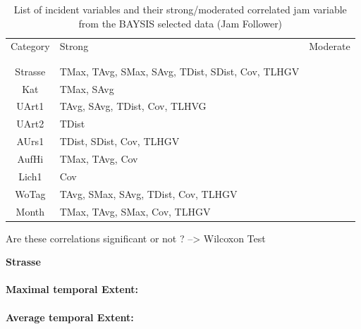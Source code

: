 \noindent
\begin{table}[h!]
	\centering
	\begin{tabular}{c|l|l}  
		Category & Strong & Moderate \\
		\\[-1em]
		\hline
		\\[-1em]
		Strasse & TMax, TAvg, SMax, SAvg, TDist, SDist, Cov, TLHGV & \\ 
 		Kat & TMax, SAvg & \\ 
 		UArt1 & TAvg, SAvg, TDist, Cov, TLHVG & \\
 		UArt2 & TDist & \\
 		AUrs1 & TDist, SDist, Cov, TLHGV & \\
 		AufHi & TMax, TAvg, Cov & \\
 		Lich1 & Cov & \\
 		WoTag & TAvg, SMax, SAvg, TDist, Cov, TLHGV & \\
 		Month & TMax, TAvg, SMax, Cov, TLHGV & \\
	\end{tabular}
	\caption{List of incident variables and their strong/moderated correlated jam variable from the BAYSIS selected data (Jam Follower)}
\end{table}

Are these correlations significant or not ? --> Wilcoxon Test

\large
\centerline{\textbf{Strasse}}
\normalsize

\paragraph{Maximal temporal Extent:}
\paragraph{Average temporal Extent:}
